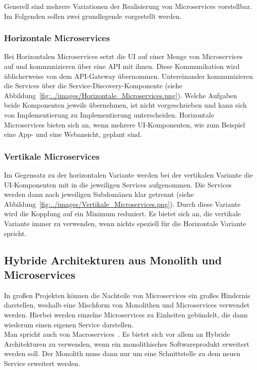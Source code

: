 Generell sind mehrere Variationen der Realisierung von Microservices vorstellbar.
Im Folgenden sollen zwei grundlegende vorgestellt werden.

\subsubsection{Horizontale Microservices} %
\label{ssub:Horizontale_Microservices}
Bei Horizontalen Microservices setzt die UI auf einer Menge von Microservices auf und kommunizieren über eine API mit ihnen.
Diese Kommunikation wird üblicherweise von dem API-Gateway übernommen.
Untereinander kommunizieren die Services über die Service-Discovery-Komponente (siehe Abbildung~\ref{fig:../images/Horizontale_Microservices.png}).
Welche Aufgaben beide Komponenten jeweils übernehmen, ist nicht vorgeschrieben und kann sich von Implementierung zu Implementierung unterscheiden.
Horizontale Microservices bieten sich an, wenn mehrere UI-Komponenten, wie zum Beispiel eine App- und eine Webansicht, geplant sind.~\cite{GrundlagenModular}

\subsubsection{Vertikale Microservices} %
\label{ssub:Vertikale_Microservices}
Im Gegensatz zu der horizontalen Variante werden bei der vertikalen Variante die UI-Komponenten mit in die jeweiligen Services aufgenommen.
Die Services werden dann nach jeweiligen Subdomänen klar getrennt (siehe Abbildung~\ref{fig:../images/Vertikale_Microservices.png}).
Durch diese Variante wird die Kopplung auf ein Minimum reduziert.
Es bietet sich an, die vertikale Variante immer zu verwenden, wenn nichts speziell für die Horizontale Variante spricht.~\cite{GrundlagenModular}

\subsection{Hybride Architekturen aus Monolith und Microservices} %
\label{sub:Hybride_Architekturen_aus_Monolith_und_Microservices}
In großen Projekten können die Nachteile von Microservices ein großes Hindernis darstellen, weshalb eine Mischform von Monolithen und Microservices verwendet werden.
Hierbei werden einzelne Microservices zu Einheiten gebündelt, die dann wiederum einen eigenen Service darstellen.~\cite{softArchGrundl}\\
Man spricht auch von Macroservices~\cite{Macroser76:online}.
Es bietet sich vor allem an Hybride Architekturen zu verwenden, wenn ein monolithisches Softwareprodukt erweitert werden soll.
Der Monolith muss dann nur um eine Schnittstelle zu dem neuen Service erweitert werden.
